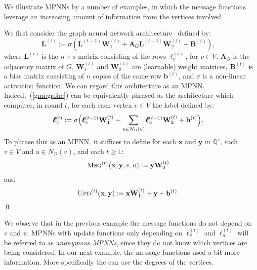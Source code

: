 We illustrate MPNNs by a number of examples, in which the message functions leverage an increasing amount of information from the vertices involved.
\begin{example}\normalfont
We first consider
the graph neural network
architecture~\cite{Hamilton2017a,grohewl} defined by:
\begin{equation}
\mathbf{L}^{(t)}:=\sigma\left(\mathbf{L}^{(t-1)}\mathbf{W}_1^{(t)}+\mathbf{A}_G\mathbf{L}^{(t-1)}\mathbf{W}_2^{(t)}+\mathbf{B}^{(t)}\right), \label{gnn:grohe}
\end{equation}
where $\mathbf{L}^{(t)}$ is the $n\times s$-matrix consisting of the rows $\pmb{\ell}^{(t)}_v$, for $v\in V$, $\mathbf{A}_G$ is the adjacency matrix of $G$, $\mathbf{W}_1^{(t)}$ and $\mathbf{W}_2^{(t)}$ are (learnable) weight matrices,
$\mathbf{B}^{(t)}$ is a bias matrix consisting of $n$ copies of the same row $\mathbf{b}^{(t)}$, and $\sigma$ is a non-linear activation function. We can regard this architecture as an MPNN. Indeed,~(\ref{gnn:grohe}) can be equivalently phrased as the architecture which computes, in round $t$, for each each vertex $v\in V$ the label defined by:
$$
\pmb{\ell}^{(t)}_v:=\sigma\Bigl(\pmb{\ell}^{(t-1)}_v\mathbf{W}_1^{(t)}+ \sum_{u\in N_G(v)}\pmb{\ell}^{(t-1)}_u\mathbf{W}_2^{(t)}+\mathbf{b}^{(t)} \Bigr).
$$
To phrase this as an MPNN, it suffices to define for each $\mathbf{x}$ and $\mathbf{y}$ in $\mathbb{Q}^s$, each $v\in V$ and $u\in N_G(v)$, and each $t\geq 1$:
$$\textsc{Msg}^{(t)}\bigl(\mathbf{x},\mathbf{y},v,u):=\mathbf{y}\mathbf{W}_2^{(t)}
$$
and 
$$\textsc{Upd}^{(t)}(\mathbf{x},\mathbf{y}):=\mathbf{x}\mathbf{W}_1^{(t)}+\mathbf{y} + \mathbf{b}^{(t)}.
$$
\qed
\end{example}
%
We observe that in the previous example the message functions do not depend on $v$ and $u$. MPNNs with update functions only depending on $\pmb{\ell}_v^{(t)}$ and $\pmb{\ell}_u^{(t)}$ will be referred to as \textit{anonymous MPNNs}, since they do not know which vertices are being considered.
In our next example, the message functions used a bit more information. More specifically the can use the degrees of the vertices.

